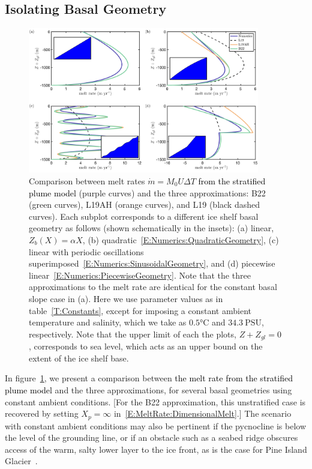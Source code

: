 \documentclass[openacc]{rsproca_new}%
\newcommand{\red}[1]{{\color{red} #1}}
\newcommand{\blue}[1]{{\color{blue} #1}}
\newcommand{\rout}[1]{\red{\st{#1}}}\newcommand{\ab}[1]{\textcolor{Green}{#1}}\newcommand{\about}[1]{\textcolor{Cyan}{\sout{#1}}}
\renewcommand{\rout}[1]{{}} %
\renewcommand{\blue}[1]{{\textcolor{black}{#1}}} %
\renewcommand{\red}[1]{{}} %
\begin{document}
\subsection{Isolating Basal Geometry}\label{S:Numerics:NoPycnocline}
\begin{figure}
\centering
\includegraphics[width = 0.9\textwidth]{./make_plots/plots/figure5.png}
\caption{Comparison between\rout{ numerically obtained} melt rates $\dot{m}= M_0 U \Delta T$ \blue{from the stratified plume model} (purple curves) and the three approximations: B22 (green curves), L19AH (orange curves), and L19 (black dashed curves). Each subplot corresponds to a different ice shelf basal geometry as follows (shown schematically in the insets): (a) linear, $Z_b(X) = \alpha X$, (b) quadratic~\eqref{E:Numerics:QuadraticGeometry}, (c) linear with periodic oscillations superimposed~\eqref{E:Numerics:SinusoidalGeometry}, and (d) piecewise linear~\eqref{E:Numerics:PiecewiseGeometry}. Note that the three approximations to the melt rate are identical for the constant basal slope case in (a).  Here we use parameter values as in table~\ref{T:Constants}, except for imposing a constant ambient temperature and salinity, which we take as $ 0.5\si{\celsius}$ and $34.3~\text{PSU}$, respectively. Note that the upper limit of each the plots, $Z + Z_{gl} = 0$, corresponds to sea level, which acts as an upper bound on the extent of the ice shelf base.}   \label{fig:Numerics:Geometry}
\end{figure}

In figure~\ref{fig:Numerics:Geometry}, we present a comparison between \rout{numerically obtained melt rates}\blue{the melt rate from the stratified plume model} and the three approximations, for several basal geometries using constant ambient conditions. [For the B22 approximation, this unstratified case is recovered by setting $X_p = \infty$ in~\eqref{E:MeltRate:DimensionalMelt}.] The scenario with constant ambient conditions may also be pertinent if the pycnocline is below the level of the grounding line, or if an obstacle such as a seabed ridge obscures access of the warm, salty lower layer to the ice front, as is the case for Pine Island Glacier~\cite{DeRydt2014JGeophysResOceans}. 
\end{document}
